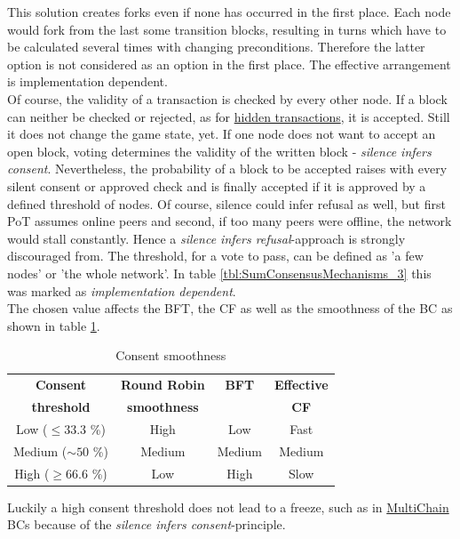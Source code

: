 This solution creates forks even if none has occurred in the first place.
Each node would fork from the last some transition blocks, resulting in turns which have to be calculated several times with changing preconditions.
Therefore the latter option is not considered as an option in the first place.
The effective arrangement is implementation dependent. \\
Of course, the validity of a transaction is checked by every other node.
If a block can neither be checked or rejected, as for \hyperref[HiddenTransactions]{hidden transactions}, it is accepted.
Still it does not change the game state, yet.
If one node does not want to accept an open block, voting determines the validity of the written block - \textit{silence infers consent}.
Nevertheless, the probability of a block to be accepted raises with every silent consent or approved check and is finally accepted if it is approved by a defined threshold of nodes.
Of course, silence could infer refusal as well, but first \gls{PoT} assumes online peers and second, if too many peers were offline, the network would stall constantly.
Hence a \textit{silence infers refusal}-approach is strongly discouraged from.
The threshold, for a vote to pass, can be defined as 'a few nodes' or 'the whole network'.
In table \ref{tbl:SumConsensusMechanisms_3} this was marked as \textit{implementation dependent}. \\
The chosen value affects the \gls{BFT}, the \gls{CF} as well as the smoothness of the \gls{BC} as shown in table \ref{tbl:ConsentSmoothness}.
\begin{table}
	\centering
	\begin{tabularx}{0.71\textwidth}{ c | c | c | c }
		\textbf{Consent} & \textbf{Round Robin} & \textbf{\gls{BFT}} & \textbf{Effective} \\
		\textbf{threshold} & \textbf{smoothness} &  & \textbf{\gls{CF}} \\ \hline
 		Low ($\leq 33.3$ \%) & High & Low & Fast \\ \hline
		Medium ($\sim 50$ \%)  & Medium & Medium & Medium \\ \hline
		High ($\geq 66.6$ \%) & Low & High & Slow \\ \hline
		\hline
	\end{tabularx}
	\caption{Consent smoothness}
	\label{tbl:ConsentSmoothness}
\end{table}
\noindent Luckily a high consent threshold does not lead to a freeze,
such as in \hyperref[def:MultiChain]{MultiChain} \gls{BC}s because of the \textit{silence infers consent}-principle.
